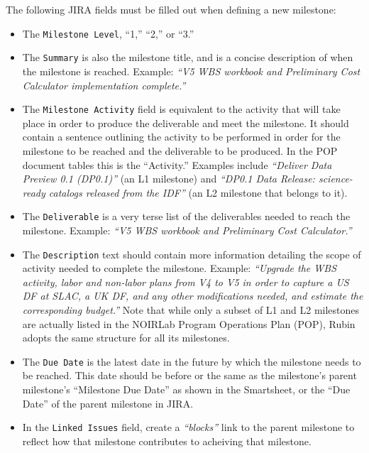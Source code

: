 The following \gls{JIRA} fields must be filled out when defining a new milestone:
\begin{itemize}
\item The \texttt{Milestone Level}, ``1,'' ``2,'' or ``3.''
\item The \texttt{Summary} is also the milestone title, and is a concise description of when the milestone is reached.
Example: \textit{``V5 \gls{WBS} workbook and Preliminary Cost Calculator implementation complete.''}
\item The \texttt{Milestone Activity} field is equivalent to the activity that will take place in order to produce the deliverable and meet the milestone.  It should contain a sentence outlining the activity to be performed in order for the milestone to be reached and the deliverable to be produced. In the \gls{POP} document tables this is the ``Activity.''
  Examples include \textit{``Deliver Data Preview 0.1 (DP0.1)''} (an L1 milestone) and \textit{``DP0.1 \gls{Data Release}: science-ready catalogs released from the \gls{IDF}''} (an \gls{L2} milestone that belongs to it).
\item The \texttt{Deliverable} is a very terse list of the deliverables needed to reach the milestone.
  Example: \textit{``V5 \gls{WBS} workbook and Preliminary Cost Calculator.''}
\item The \texttt{Description} text should contain more information detailing the scope of activity needed to complete the milestone.
  Example: \textit{``Upgrade the WBS activity, labor and non-labor plans from V4 to V5 in order to capture a \gls{US} \gls{DF} at SLAC, a \gls{UK} \gls{DF}, and any other modifications needed, and estimate the corresponding budget.''}
  Note that while only a subset of L1 and L2 milestones are actually listed in the \gls{NOIRLab} Program \gls{Operations} Plan (\gls{POP}), Rubin adopts the same structure for all its milestones.
\item The \texttt{Due Date} is the latest date in the future by which the milestone needs to be reached.
  This date should be before or the same as the milestone's parent milestone's ``Milestone Due Date'' as shown in the Smartsheet, or the ``Due Date'' of the parent milestone in \gls{JIRA}.
\item In the \texttt{Linked Issues} field, create a \textit{``blocks''} link to the parent milestone to reflect how that milestone contributes to acheiving that milestone.
\end{itemize}

